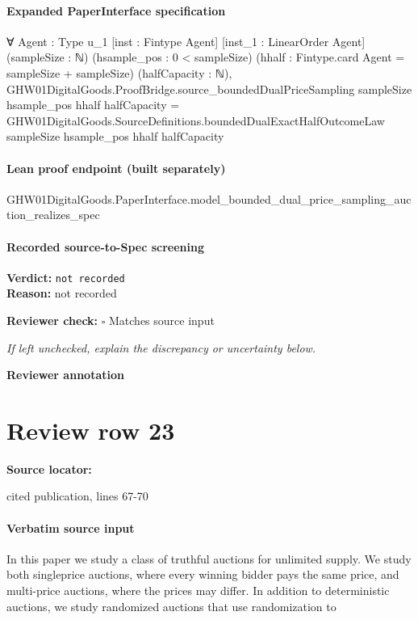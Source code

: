 \documentclass[10pt]{article}
\newcommand{\reviewerbox}{%
  \par\noindent\fbox{\parbox{0.96\linewidth}{\rule{0pt}{0.38in}}}\par
}
\newcommand{\reviewmatch}[1]{%
  \par\noindent\textbf{Reviewer check:} $\square$\; #1\par
  \noindent\emph{If left unchecked, explain the discrepancy or uncertainty below.}\par
}
\begin{document}
\paragraph{Expanded PaperInterface specification}
\begin{ReviewVerbatim}
∀ {Agent : Type u_1} [inst : Fintype Agent] [inst_1 : LinearOrder Agent] (sampleSize : ℕ) (hsample_pos : 0 < sampleSize)
  (hhalf : Fintype.card Agent = sampleSize + sampleSize) (halfCapacity : ℕ),
  GHW01DigitalGoods.ProofBridge.source_boundedDualPriceSampling sampleSize hsample_pos hhalf halfCapacity =
    GHW01DigitalGoods.SourceDefinitions.boundedDualExactHalfOutcomeLaw sampleSize hsample_pos hhalf halfCapacity
\end{ReviewVerbatim}

\paragraph{Lean proof endpoint (built separately)}\begin{ReviewVerbatim}
GHW01DigitalGoods.PaperInterface.model_bounded_dual_price_sampling_auction_realizes_spec
\end{ReviewVerbatim}

\paragraph{Recorded source-to-Spec screening}
\textbf{Verdict:} \texttt{not recorded}
\\
\textbf{Reason:} not recorded
\reviewmatch{Matches source input}
\noindent\textbf{Reviewer annotation}\par
\reviewerbox
\clearpage
\hypertarget{source-claim-4e4374900527b0f0}{}
\section*{Review row 23}
\textbf{Source locator:} {\footnotesize\raggedright cited publication, lines 67-\allowbreak{}70\par}
\paragraph{Verbatim source input}
\begin{ReviewVerbatim}
In this paper we study a class of truthful auctions for unlimited supply. We study both singleprice auctions, where every winning bidder pays the
same price, and multi-price auctions, where the prices
may differ. In addition to deterministic auctions, we
study randomized auctions that use randomization to
\end{ReviewVerbatim}
\end{document}
